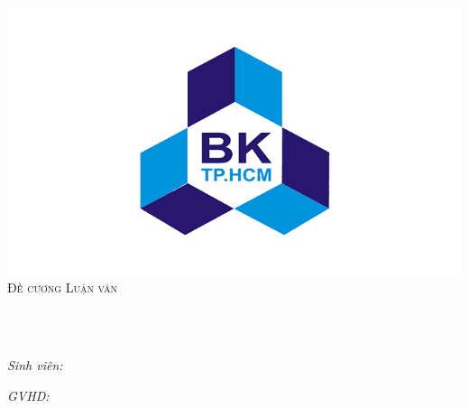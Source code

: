 \documentclass[
11pt, %
english,%
singlespacing, %
parskip, %
headsepline, %
]{MastersDoctoralThesis} %
\author{Lê Công Huy\\ Nguyễn Hoàng Mẫn Tiến} %
\begin{document}
\frontmatter %

\pagestyle{plain} %


\begin{titlepage}
\begin{center}
{\scshape\Large \univname\par}{\large \deptname}\\%
\includegraphics[scale = 0.3]{logo.png}\\ \vspace{1.5cm}	%
\textsc{\LARGE Đề cương Luận văn}\\[0.5cm] %

\hrulefill \\[0.4cm] %
{\huge \bfseries \ttitle\par}\vspace{0.4cm} %
\hrulefill \\[1.5cm] %
 
\begin{minipage}[t]{0.4\textwidth}
\begin{flushleft} \large
\emph{Sinh viên:}\\
{\authorname} %
\end{flushleft}
\end{minipage}
\begin{minipage}[t]{0.4\textwidth}
\begin{flushright} \large
\emph{GVHD:} \\
{\supname} %
\end{flushright}
\end{minipage}\\[4cm]
 

\end{center}
\end{titlepage}
\end{document}
